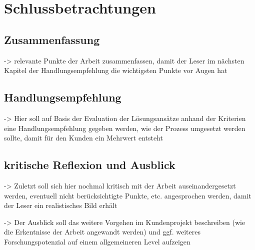 \chapter{Schlussbetrachtungen}

\section{Zusammenfassung}

-> relevante Punkte der Arbeit zusammenfassen, damit der Leser im nächsten Kapitel der Handlungsempfehlung die wichtigsten Punkte vor Augen hat

\section{Handlungsempfehlung}

-> Hier soll auf Basis der Evaluation der Lösungsansätze anhand der Kriterien eine Handlungsempfehlung gegeben werden, wie der Prozess umgesetzt werden sollte, damit für den Kunden ein Mehrwert entsteht

\section{kritische Reflexion und Ausblick}

-> Zuletzt soll sich hier nochmal kritisch mit der Arbeit auseinandergesetzt werden, eventuell nicht berücksichtigte Punkte, etc. angesprochen werden, damit der Leser ein realistisches Bild erhält

-> Der Ausblick soll das weitere Vorgehen im Kundenprojekt beschreiben (wie die Erkentnisse der Arbeit angewandt werden) und ggf. weiteres Forschungspotenzial auf einem allgemeineren Level aufzeigen